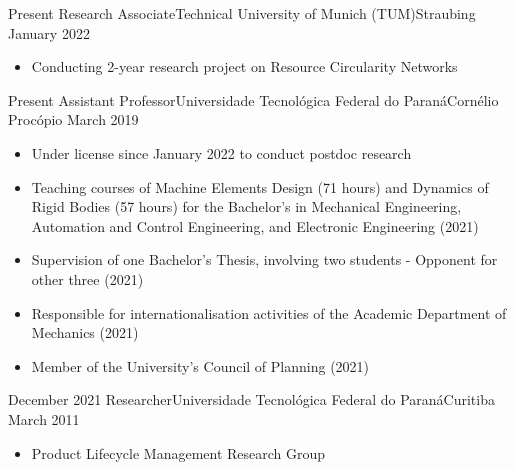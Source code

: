 %
%
%
\begin{experiences}
  \experience
    {Present}   {Research Associate}{Technical University of Munich (TUM)}{Straubing}
    {January 2022} {
                      \begin{itemize}
                        \item Conducting 2-year research project on Resource Circularity Networks 
                      \end{itemize}
                    }
                    
  \emptySeparator
  
  \experience
    {Present}   {Assistant Professor}{Universidade Tecnológica Federal do Paraná}{Cornélio Procópio}
    {March 2019} {
                      \begin{itemize}
                        \item Under license since January 2022 to conduct postdoc research
                        \item Teaching courses of Machine Elements Design (71 hours) and Dynamics of Rigid Bodies (57 hours) for the Bachelor's in Mechanical Engineering, Automation and Control Engineering, and Electronic Engineering (2021)
                        \item Supervision of one Bachelor's Thesis, involving two students - Opponent for other three (2021)
                        \item Responsible for internationalisation activities of the Academic Department of Mechanics (2021)
                        \item Member of the University's Council of Planning (2021)
                      \end{itemize}
                    }
                    
  \emptySeparator
  
    \experience
    {December 2021}   {Researcher}{Universidade Tecnológica Federal do Paraná}{Curitiba}
    {March 2011} {
                      \begin{itemize}
                        \item Product Lifecycle Management Research Group
                      \end{itemize}
                    }
                    

\end{experiences}
